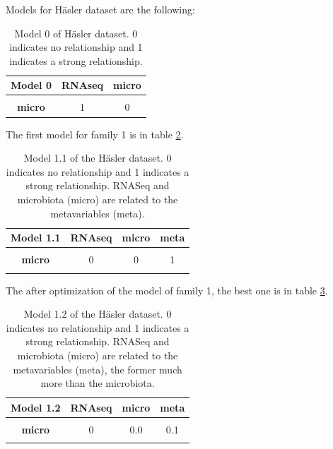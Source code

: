 \documentclass[
  12pt,
  a4paper,
  twoside,
  openright]{book}
\begin{document}
Models for Häsler dataset are the following:

\begin{table}[H]

\caption[Model 0 of Häsler dataset.]{\label{tab:hasler-model-0}Model 0 of Häsler dataset. 0 indicates no relationship and 1 indicates a strong relationship.}
\centering
\begin{tabular}[t]{>{}c|c|c}
\hline
\textbf{Model 0} & \textbf{RNAseq} & \textbf{micro}\\
\hline
\textbf{\cellcolor{gray!6}{RNAseq}} & \cellcolor{gray!6}{0} & \cellcolor{gray!6}{1}\\
\hline
\textbf{micro} & 1 & 0\\
\hline
\end{tabular}
\end{table}

The first model for family 1 is in table \ref{tab:hasler-model-1-1}.

\begin{table}[H]

\caption[Model 1.1 of the Häsler dataset.]{\label{tab:hasler-model-1-1}Model 1.1 of the Häsler dataset. 0 indicates no relationship and 1 indicates a strong relationship. RNASeq and microbiota (micro) are related to the metavariables (meta).}
\centering
\begin{tabular}[t]{>{}c|c|c|c}
\hline
\textbf{Model 1.1} & \textbf{RNAseq} & \textbf{micro} & \textbf{meta}\\
\hline
\textbf{\cellcolor{gray!6}{RNAseq}} & \cellcolor{gray!6}{0} & \cellcolor{gray!6}{0} & \cellcolor{gray!6}{1}\\
\hline
\textbf{micro} & 0 & 0 & 1\\
\hline
\textbf{\cellcolor{gray!6}{meta}} & \cellcolor{gray!6}{1} & \cellcolor{gray!6}{1} & \cellcolor{gray!6}{0}\\
\hline
\end{tabular}
\end{table}

The after optimization of the model of family 1, the best one is in table \ref{tab:hasler-model-1-2}.

\begin{table}[H]

\caption[Model 1.2 of the Häsler dataset.]{\label{tab:hasler-model-1-2}Model 1.2 of the Häsler dataset. 0 indicates no relationship and 1 indicates a strong relationship. RNASeq and microbiota (micro) are related to the metavariables (meta), the former much more than the microbiota.}
\centering
\begin{tabular}[t]{>{}c|c|c|c}
\hline
\textbf{Model 1.2} & \textbf{RNAseq} & \textbf{micro} & \textbf{meta}\\
\hline
\textbf{\cellcolor{gray!6}{RNAseq}} & \cellcolor{gray!6}{0} & \cellcolor{gray!6}{0.0} & \cellcolor{gray!6}{1.0}\\
\hline
\textbf{micro} & 0 & 0.0 & 0.1\\
\hline
\textbf{\cellcolor{gray!6}{meta}} & \cellcolor{gray!6}{1} & \cellcolor{gray!6}{0.1} & \cellcolor{gray!6}{0.0}\\
\hline
\end{tabular}
\end{table}
\end{document}
